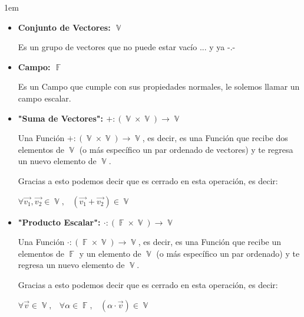 \documentclass[12pt, fleqn]{report}                             %
\newenvironment{SmallIndentation}[1][0.75em]                    %
        {\begin{adjustwidth}{#1}{}\begin{footnotesize}}             %
        {\end{footnotesize}\end{adjustwidth}}                       %
\DeclareMathOperator \Space     {\quad}                         %
\DeclareMathOperator \MiniSpace {\;}                            %
\theoremstyle{break}                                            %
\DeclareMathOperator \GenericField {\mathbb{F}}                 %
\DeclareMathOperator \VectorSet    {\mathbb{V}}                 %
\begin{document}
            \begin{SmallIndentation}[1em]
                
                \begin{itemize}
                
                    \item
                        \textbf{Conjunto de Vectores: $\VectorSet$}

                        Es un grupo de vectores que no puede estar vacío ... y ya -.- 

                    \item
                        \textbf{Campo: $\GenericField$}

                        Es un Campo que cumple con sus propiedades normales, le solemos llamar un campo escalar.

                    \item
                        \textbf{"Suma de Vectores": $+: (\VectorSet \times  \VectorSet) \to \VectorSet$}

                        Una Función $+: (\VectorSet \times  \VectorSet) \to \VectorSet$, es decir, es una Función
                        que recibe dos elementos de $\VectorSet$ (o más específico un par ordenado de vectores) y te
                        regresa un nuevo elemento de $\VectorSet$.

                        Gracias a esto podemos decir que es cerrado en esta operación, es decir:

                        $\forall \vec{v_1}, \vec{v_2} \in \VectorSet,
                            \MiniSpace (\vec{v_1} + \vec{v_2}) \in \VectorSet$  


                    \item
                        \textbf{"Producto Escalar": $\cdot: (\GenericField \times  \VectorSet) \to \VectorSet$}

                        Una Función $\cdot: (\GenericField \times  \VectorSet) \to \VectorSet$, es decir, es una Función
                        que recibe un elementos de $\GenericField$ y un elemento de $\VectorSet$
                        (o más específico un par ordenado) y te regresa un nuevo elemento de $\VectorSet$.

                        Gracias a esto podemos decir que es cerrado en esta operación, es decir:

                        $\forall \vec{v} \in \VectorSet, \MiniSpace
                            \forall \alpha \in \GenericField, \MiniSpace
                                (\alpha \cdot \vec{v}) \in \VectorSet$  
                \end{itemize}
            
            \end{SmallIndentation}
\end{document}

